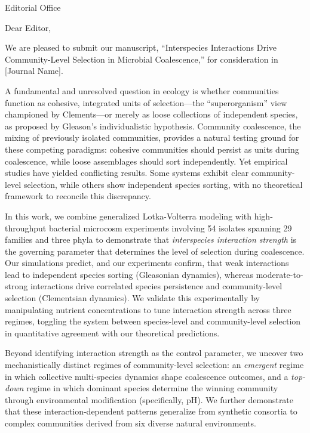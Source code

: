 \documentclass[11pt]{letter}
\begin{document}
\begin{letter}{Editorial Office \\ [Journal Name]}

\opening{Dear Editor,}

We are pleased to submit our manuscript, ``Interspecies Interactions Drive Community-Level Selection in Microbial Coalescence,'' for consideration in [Journal Name].

A fundamental and unresolved question in ecology is whether communities function as cohesive, integrated units of selection---the ``superorganism'' view championed by Clements---or merely as loose collections of independent species, as proposed by Gleason's individualistic hypothesis. Community coalescence, the mixing of previously isolated communities, provides a natural testing ground for these competing paradigms: cohesive communities should persist as units during coalescence, while loose assemblages should sort independently. Yet empirical studies have yielded conflicting results. Some systems exhibit clear community-level selection, while others show independent species sorting, with no theoretical framework to reconcile this discrepancy.

In this work, we combine generalized Lotka-Volterra modeling with high-throughput bacterial microcosm experiments involving 54 isolates spanning 29 families and three phyla to demonstrate that \textit{interspecies interaction strength} is the governing parameter that determines the level of selection during coalescence. Our simulations predict, and our experiments confirm, that weak interactions lead to independent species sorting (Gleasonian dynamics), whereas moderate-to-strong interactions drive correlated species persistence and community-level selection (Clementsian dynamics). We validate this experimentally by manipulating nutrient concentrations to tune interaction strength across three regimes, toggling the system between species-level and community-level selection in quantitative agreement with our theoretical predictions.

Beyond identifying interaction strength as the control parameter, we uncover two mechanistically distinct regimes of community-level selection: an \textit{emergent} regime in which collective multi-species dynamics shape coalescence outcomes, and a \textit{top-down} regime in which dominant species determine the winning community through environmental modification (specifically, pH). We further demonstrate that these interaction-dependent patterns generalize from synthetic consortia to complex communities derived from six diverse natural environments.


\end{letter}
\end{document}
